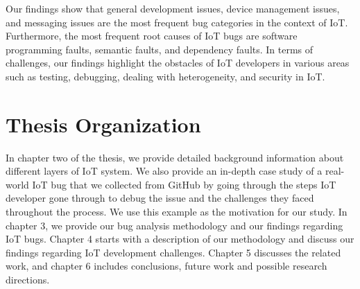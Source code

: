 Our findings show that general development issues, device management issues, and messaging issues are the most frequent bug categories in the context of IoT. Furthermore, the most frequent root causes of IoT bugs are software programming faults, semantic faults, and dependency faults. In terms of challenges, our findings highlight the obstacles of IoT developers in various areas such as testing, debugging, dealing with heterogeneity, and security in IoT. 

\section{Thesis Organization }
In chapter two of the thesis, we provide detailed background information about different layers of IoT system. We also provide an in-depth case study of a real-world IoT bug that we collected from GitHub by going through the steps IoT developer gone through to debug the issue and the challenges they faced throughout the process. We use this example as the motivation for our study. In chapter 3, we provide our bug analysis methodology and our findings regarding IoT bugs. Chapter 4 starts with a description of our methodology and discuss our findings regarding IoT development challenges. Chapter 5 discusses the related work, and chapter 6 includes conclusions, future work and possible research directions.

\endinput


